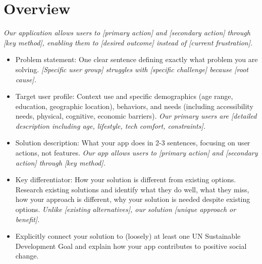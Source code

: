 \section{Overview}
\emph{Our application allows users to [primary action] and [secondary action] through [key method], enabling them to [desired outcome] instead of [current frustration].}

\begin{itemize}
    \item Problem statement: One clear sentence defining exactly what problem you are solving. \emph{[Specific user group] struggles with [specific challenge] because [root cause].}
    \item Target user profile: Context use and specific demographics (age range, education, geographic location), behaviors, and needs (including accessibility needs, physical, cognitive, economic barriers). \emph{Our primary users are [detailed description including age, lifestyle, tech comfort, constraints].}
    \item Solution description: What your app does in 2-3 sentences, focusing on user actions, not features. \emph{Our app allows users to [primary action] and [secondary action] through [key method].}
    \item Key differentiator: How your solution is different from existing options. Research existing solutions and identify what they do well, what they miss, how your approach is different, why your solution is needed despite existing options. \emph{Unlike [existing alternatives], our solution [unique approach or benefit].}
    \item Explicitly connect your solution to (loosely) at least one UN Sustainable Development Goal and explain how your app contributes to positive social change.
\end{itemize}